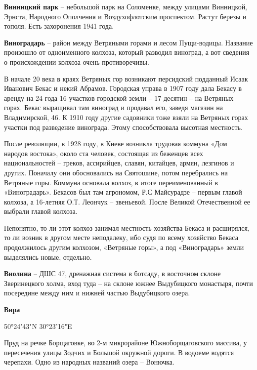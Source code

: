 \medskip

\textbf{Винницкий парк} – небольшой парк на Соломенке, между улицами Винницкой, Эрнста, Народного Ополчения и Воздухофлотским проспектом. Растут березы и тополя. Есть захоронения 1941 года.\\

\medskip

\textbf{Виноградарь} – район между Ветряными горами и лесом Пущи-водицы. Название произошло от одноименного колхоза, который разводил виноград, а вот сведения о происхождении колхоза очень противоречивы.

В начале 20 века в краях Ветряных гор возникают персидский подданный Исаак Иванович Бекас и некий Абрамов. Городская управа в 1907 году дала Бекасу в аренду на 24 года 16 участков городской земли – 17 десятин – на Ветряных горах. Бекас выращивал там виноград и продавал его, заведя магазин на Владимирской, 46. К 1910 году другие садовники тоже взяли на Ветряных горах участки под разведение винограда. Этому способствовала высотная местность.

После революции, в 1928 году, в Киеве возникла трудовая коммуна «Дом народов востока», около ста человек, состоящая из беженцев всех национальностей – греков, ассирийцев, славян, китайцев, армян, лезгинов и других. Поначалу они обосновались на Святошине, потом перебрались на Ветряные горы. Коммуна основала колхоз, в итоге переименованный в «Виноградарь». Бекасов был там агрономом, Р.С Майсурадзе – первым главой колхоза, а 16-летняя О.Т. Леончук – звеньевой. После Великой Отечественной ее выбрали главой колхоза.

Непонятно, то ли этот колхоз занимал местность хозяйства Бекаса и расширялся, то ли возник в другом месте неподалеку, ибо судя по всему хозяйство Бекаса продолжилось другим колхозом, «Ветряные горы», а под «Виноградарь» земли выделялись новые, отдельно.\\ 

\medskip

\textbf{Виолина} – ДШС 47, дренажная система в ботсаду, в восточном склоне Зверинецкого холма, вход туда – на склоне южнее Выдубицкого монастыря, почти посередине между ним и нижней частью Выдубицкого озера.\\

\medskip

\textbf{Вира} 

50°24'43"N 30°23'16"E

Пруд на речке Борщаговке, во 2-м микрорайоне Южноборщаговского массива, у пересечения улицы Зодчих и Большой окружной дороги. В водоеме водятся черепахи. Одно из народных названий озера – Вонючка.\\

